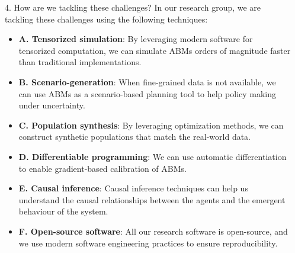 \documentclass[final,hyperref={pdfpagelabels=false}]{beamer}
\begin{document}
\begin{frame}[t]
\begin{columns}[t]
\begin{column}{.48\textwidth}
    \begin{block}{4. How are we tackling these challenges?}
      In our research group, we are tackling these challenges using the following techniques:
      \begin{itemize}
        \item \justifying \textbf{A. Tensorized simulation}: By leveraging modern software for tensorized computation, we can simulate ABMs orders of magnitude faster than traditional implementations.
        \item \justifying \textbf{B. Scenario-generation}: When fine-grained data is not available, we can use ABMs as a scenario-based planning tool to help policy making under uncertainty.
        \item \justifying \textbf{C. Population synthesis}: By leveraging optimization methods, we can construct synthetic populations that match the real-world data. 
        \item \justifying \textbf{D. Differentiable programming}: We can use automatic differentiation to enable gradient-based calibration of ABMs.
        \item \justifying \textbf{E. Causal inference}: Causal inference techniques can help us understand the causal relationships between the agents and the emergent behaviour of the system.
        \item \justifying \textbf{F. Open-source software}: All our research software is open-source, and we use modern software engineering practices to ensure reproducibility.

      \end{itemize}
    \end{block}

  \end{column} %



  \begin{column}{.02\textwidth}\end{column} %

\end{columns} %


\end{frame}
\end{document}
